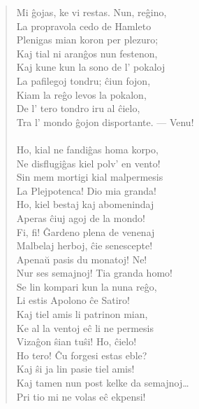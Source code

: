 \begin{verse}
                Mi \^gojas, ke vi restas. Nun, reĝino,\\
                La propravola cedo de Hamleto\\
                Plenigas mian koron per plezuro;\\
                Kaj tial ni aran\^gos nun festenon,\\
                Kaj kune kun la sono de l' pokaloj\\
                La pafilegoj tondru; \^ciun fojon,\\
                Kiam la reĝo levos la pokalon,\\
                De l' tero tondro iru al \^cielo,\\
                Tra l' mondo \^gojon disportante. --- Venu!\\
\\
 Ho, kial ne fandi\^gas homa korpo,\\
                Ne disflugi\^gas kiel polv' en vento!\\
                Sin mem mortigi kial malpermesis\\
                La Plejpotenca! Dio mia granda!\\
                Ho, kiel bestaj kaj abomenindaj\\
                Aperas ĉiuj agoj de la mondo!\\
                Fi, fi! \^Gardeno plena de venenaj\\
                Malbelaj herboj, \^cie senescepte!\\
                Apena\u u pasis du monatoj! Ne!\\
                Nur ses semajnoj! Tia granda homo!\\
                Se lin kompari kun la nuna reĝo,\\
                Li estis Apolono \^ce Satiro!\\
                Kaj tiel amis li patrinon mian,\\
                Ke al la ventoj e\^c li ne permesis\\
                Viza\^gon \^sian tu\^si! Ho, \^cielo!\\
                Ho tero! \^Cu forgesi estas eble?\\
                Kaj \^si ja lin pasie tiel amis!\\
                Kaj tamen nun post kelke da semajnoj\dots\\
                Pri tio mi ne volas e\^c ekpensi!\\

\end{verse}
